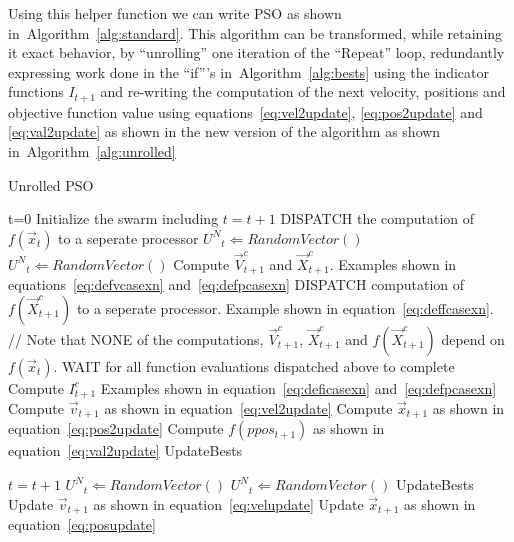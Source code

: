 \documentclass[journal,letterpaper]{IEEEtran}
\newcommand{\alg}[1]{Algorithm~\ref{alg:#1}}
\providecommand{\pers}{\ensuremath{P}}
\providecommand{\neigh}{\ensuremath{N}}
\providecommand{\nURand}{\ensuremath{U^\neigh}}
\providecommand{\ppos}{\ensuremath{\Vec{x}}}
\providecommand{\pvel}{\ensuremath{\Vec{v}}}
\providecommand{\fnbest}{\ensuremath{\Vec{fb}^\neigh}}
\providecommand{\fpbest}{\ensuremath{\Vec{fb}^\pers}}
\providecommand{\ofunc}{\ensuremath{f}}
\providecommand{\swarm}{\ensuremath{swarm}}
\providecommand{\indic}{\ensuremath{I}}
\providecommand{\specvel}{\ensuremath{\vec{V}}}
\providecommand{\specpos}{\ensuremath{\vec{X}}}
\providecommand{\caseset}{\ensuremath{\mathcal{C}}}
\begin{document}
Using this helper function we can write PSO as shown in~\alg{standard}.
This algorithm can be transformed, while retaining it exact behavior, by
``unrolling'' one iteration of the ``Repeat'' loop, redundantly expressing work done in the ``if'''s
in~\alg{bests}
using the indicator functions $\indic_{t+1}$ and re-writing the computation of the next velocity,
positions and objective function value using 
equations~\eqref{eq:vel2update}, \eqref{eq:pos2update} and \eqref{eq:val2update} 
as shown in the new version of the algorithm as shown in~\alg{unrolled}

\begin{algorithm} [ht!]
  \caption{Unrolled PSO}
  \label{alg:unrolled}
  \begin{algorithmic}[1]
    \STATE t=0
    \STATE Initialize the swarm including
    \REPEAT
        \STATE $t=t+1$
          \label{alg2:fatitert}
          \STATE DISPATCH the computation of {$\ofunc(\ppos_{t})$} to a seperate processor
        \ENDFOR
          \STATE $\nURand_{t} \Leftarrow RandomVector()$
          \STATE $\nURand_{t} \Leftarrow RandomVector()$
          \FOR{$c \in \caseset$}
            \STATE Compute $\specvel_{t+1}^c$ and $\specpos_{t+1}^c$.
	    Examples shown in equations~\eqref{eq:defvcasexn} and~\eqref{eq:defpcasexn}
            \label{alg2:fatitertp1}
            \STATE DISPATCH computation of $\ofunc(\specpos_{t+1}^c)$ to a seperate processor.
	    Example shown in equation~\eqref{eq:deffcasexn}.
	    // Note that NONE of the computations, $\specvel_{t+1}^c$,
	    $\specpos_{t+1}^c$ and $\ofunc(\specpos_{t+1}^c)$ depend on $\ofunc(\ppos_{t})$.
          \ENDFOR
        \ENDFOR
        \STATE WAIT for all function evaluations dispatched above to complete
          \FOR{$c \in \caseset$}
            \STATE Compute $\indic_{t+1}^c$
	           Examples shown in equation~\eqref{eq:deficasexn} and~\eqref{eq:defpcasexn}
	  \ENDFOR 
            \label{alg2:startcut}
          \STATE Compute $\pvel_{t+1}$ as shown in equation~\eqref{eq:vel2update} 
          \STATE Compute $\ppos_{t+1}$ as shown in equation~\eqref{eq:pos2update}
          \STATE Compute $\ofunc(ppos_{t+1})$ as shown in equation~\eqref{eq:val2update}
	  \STATE UpdateBests
            \label{alg2:endcut}
        \ENDFOR

        \STATE $t=t+1$
          \STATE $\nURand_{t} \Leftarrow RandomVector()$
          \STATE $\nURand_{t} \Leftarrow RandomVector()$
          \STATE UpdateBests
          \STATE Update $\pvel_{t+1}$ as shown in equation~\eqref{eq:velupdate} 
          \STATE Update $\ppos_{t+1}$ as shown in equation~\eqref{eq:posupdate}
        \ENDFOR
  \end{algorithmic}
\end{algorithm}
\end{document}
